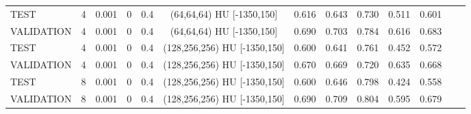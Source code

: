 \begin{table}[!htbp]
{\begin{tabular}{lcccccccccccc}
TEST & 4 & 0.001 & 0 & 0.4 & (64,64,64) HU [-1350,150] & 0.616 & 0.643 & 0.730 & 0.511 & 0.601 \\
VALIDATION & 4 & 0.001 & 0 & 0.4 & (64,64,64) HU [-1350,150] & 0.690 & 0.703 & 0.784 & 0.616 & 0.683 \\
\midrule
TEST & 4 & 0.001 & 0 & 0.4 & (128,256,256) HU [-1350,150] & 0.600 & 0.641 & 0.761 & 0.452 & 0.572 \\
VALIDATION & 4 & 0.001 & 0 & 0.4 & (128,256,256) HU [-1350,150] & 0.670 & 0.669 & 0.720 & 0.635 & 0.668 \\

\midrule
TEST & 8 & 0.001 & 0 & 0.4 & (128,256,256) HU [-1350,150] & 0.600 & 0.646 & 0.798 & 0.424 & 0.558 \\
VALIDATION & 8 & 0.001 & 0 & 0.4 & (128,256,256) HU [-1350,150] & 0.690 & 0.709 & 0.804 & 0.595 & 0.679 \\
\midrule


\end{tabular}}
\end{table}
